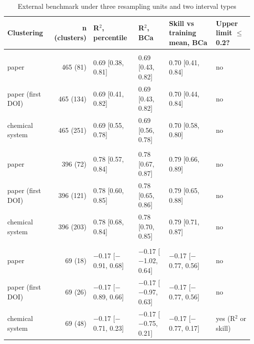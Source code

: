 \begin{table}
\caption{External benchmark under three resampling units and two interval types}
\label{tab:tableS4_external_clusterings}
\tablefont
\begin{tabularx}{\textwidth}{@{}>{\raggedright\arraybackslash}Xrllll@{}}
\toprule
\textbf{Clustering} & \textbf{n (clusters)} & \textbf{R$^2$, percentile} & \textbf{R$^2$, BCa} & \textbf{Skill vs training mean, BCa} & \textbf{Upper limit $\leq$ 0.2?} \\
\midrule
\multicolumn{6}{@{}l@{}}{\textit{blind}} \\
\quad paper & 465 (81) & 0.69 [0.38, 0.81] & 0.69 [0.43, 0.82] & 0.70 [0.41, 0.84] & no \\
\quad paper (first DOI) & 465 (134) & 0.69 [0.41, 0.82] & 0.69 [0.43, 0.82] & 0.70 [0.44, 0.84] & no \\
\quad chemical system & 465 (251) & 0.69 [0.55, 0.78] & 0.69 [0.56, 0.78] & 0.70 [0.58, 0.80] & no \\
\addlinespace
\multicolumn{6}{@{}l@{}}{\textit{blind + seen chemical system}} \\
\quad paper & 396 (72) & 0.78 [0.57, 0.84] & 0.78 [0.67, 0.87] & 0.79 [0.66, 0.89] & no \\
\quad paper (first DOI) & 396 (121) & 0.78 [0.60, 0.85] & 0.78 [0.65, 0.86] & 0.79 [0.65, 0.88] & no \\
\quad chemical system & 396 (203) & 0.78 [0.68, 0.84] & 0.78 [0.70, 0.85] & 0.79 [0.71, 0.87] & no \\
\addlinespace
\multicolumn{6}{@{}l@{}}{\textit{blind + unseen chemical system}} \\
\quad paper & 69 (18) & $-$0.17 [$-$0.91, 0.68] & $-$0.17 [$-$1.02, 0.64] & $-$0.17 [$-$0.77, 0.56] & no \\
\quad paper (first DOI) & 69 (26) & $-$0.17 [$-$0.89, 0.66] & $-$0.17 [$-$0.97, 0.63] & $-$0.17 [$-$0.77, 0.56] & no \\
\quad chemical system & 69 (48) & $-$0.17 [$-$0.71, 0.23] & $-$0.17 [$-$0.75, 0.21] & $-$0.17 [$-$0.77, 0.17] & yes (R$^2$ or skill) \\
\bottomrule
\end{tabularx}
\end{table}
